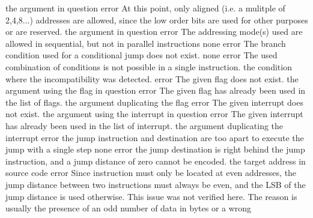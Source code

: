 \documentclass[12pt,twoside]{report}
\begin{document}
\begin{description}
               {the argument in question}
               {error}
               {At this point, only aligned (i.e. a mulitple of 2,4,8...) addresses
                are allowed, since the low order bits are used for other purposes
                or are reserved.}
               {the argument in question}
               {error}
               {The addressing mode(s) used are allowed in sequential,
                but not in parallel instructions}
               {none}
               {error}
               {The branch condition used for a conditional jump does not
                exist.}
               {none}
               {error}
               {The used combination of conditions is not possible
                in a single instruction.}
               {the condition where the incompatibility was detected.}
               {error}
               {The given flag does not exist.}
               {the argument using the flag in question}
               {error}
               {The given flag has already been used in the list of flags.}
               {the argument duplicating the flag}
               {error}
               {The given interrupt does not exist.}
               {the argument using the interrupt in question}
               {error}
               {The given interrupt has already been used in the list of interrupt.}
               {the argument duplicating the interrupt}
               {error}
               {the jump instruction and destination are too apart to
                execute the jump with a single step}
               {none}
               {error}
               {the jump destination is right behind the jump instruction,
                and a jump distance of zero cannot be encoded.}
               {the target address in source code}
               {error}
               {Since instruction must only be located at even addresses,
                the jump distance between two instructions must always be
                even, and the LSB of the jump distance is used otherwise.
                This issue was not verified here. The reason is usually the
                presence of an odd number of data in bytes or a wrong
}
\end{description}
\end{document}

